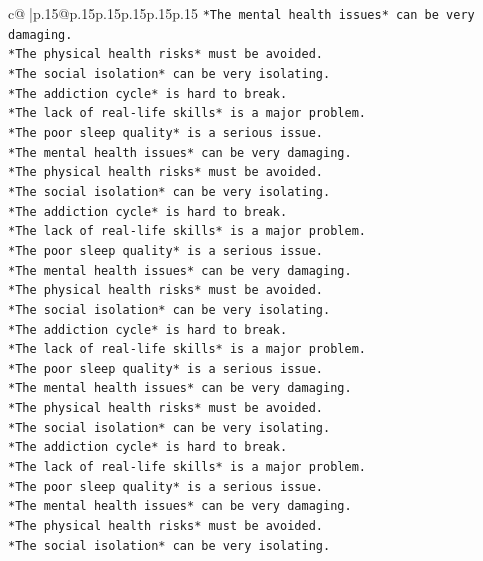 \documentclass{article}
\begin{document}
{\begin{supertabular}{c@{$\;$}|p{.15\linewidth}@{}p{.15\linewidth}p{.15\linewidth}p{.15\linewidth}p{.15\linewidth}p{.15\linewidth}}
{{{\texttt{*The mental health issues* can be very damaging.} \\
\texttt{*The physical health risks* must be avoided.} \\
\texttt{*The social isolation* can be very isolating.} \\
\texttt{*The addiction cycle* is hard to break.} \\
\texttt{*The lack of real{-}life skills* is a major problem.} \\
\texttt{*The poor sleep quality* is a serious issue.} \\
\texttt{*The mental health issues* can be very damaging.} \\
\texttt{*The physical health risks* must be avoided.} \\
\texttt{*The social isolation* can be very isolating.} \\
\texttt{*The addiction cycle* is hard to break.} \\
\texttt{*The lack of real{-}life skills* is a major problem.} \\
\texttt{*The poor sleep quality* is a serious issue.} \\
\texttt{*The mental health issues* can be very damaging.} \\
\texttt{*The physical health risks* must be avoided.} \\
\texttt{*The social isolation* can be very isolating.} \\
\texttt{*The addiction cycle* is hard to break.} \\
\texttt{*The lack of real{-}life skills* is a major problem.} \\
\texttt{*The poor sleep quality* is a serious issue.} \\
\texttt{*The mental health issues* can be very damaging.} \\
\texttt{*The physical health risks* must be avoided.} \\
\texttt{*The social isolation* can be very isolating.} \\
\texttt{*The addiction cycle* is hard to break.} \\
\texttt{*The lack of real{-}life skills* is a major problem.} \\
\texttt{*The poor sleep quality* is a serious issue.} \\
\texttt{*The mental health issues* can be very damaging.} \\
\texttt{*The physical health risks* must be avoided.} \\
\texttt{*The social isolation* can be very isolating.} \\
}}}
\end{supertabular}}
\end{document}
